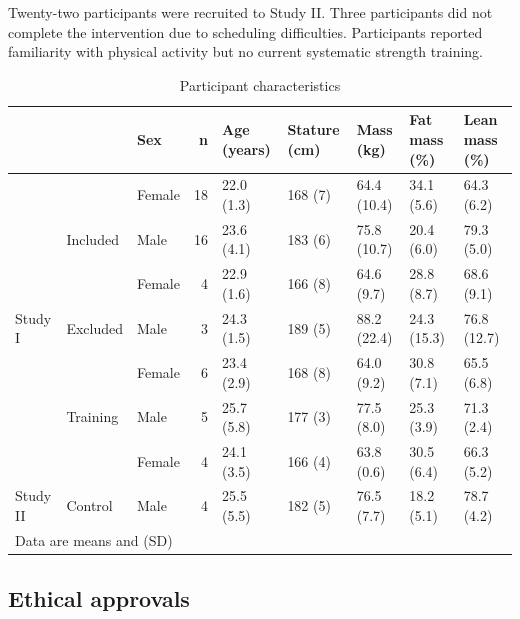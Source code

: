 \documentclass[twoside,10pt]{gihclass} %
\begin{document}
Twenty-two participants were recruited to Study II. Three participants did not complete the intervention due to scheduling difficulties. Participants reported familiarity with physical activity but no current systematic strength training.
\begin{landscape}\begin{table}

\caption{\label{tab:characteristics-table}Participant characteristics}
\centering
\fontsize{7}{9}\selectfont
\begin{tabular}[t]{lllrlllll}
\toprule
  &   & Sex & n & Age (years) & Stature
(cm) & Mass (kg) & Fat mass (\%) & Lean mass (\%)\\
\midrule
 &  & Female & 18 & 22.0 (1.3) & 168 (7) & 64.4 (10.4) & 34.1 (5.6) & 64.3 (6.2)\\
\cmidrule{3-9}
 & \multirow{-2}{*}{\raggedright\arraybackslash Included} & Male & 16 & 23.6 (4.1) & 183 (6) & 75.8 (10.7) & 20.4 (6.0) & 79.3 (5.0)\\
\cmidrule{2-9}
 &  & Female & 4 & 22.9 (1.6) & 166 (8) & 64.6 (9.7) & 28.8 (8.7) & 68.6 (9.1)\\
\cmidrule{3-9}
\multirow{-4}{*}{\raggedright\arraybackslash Study I} & \multirow{-2}{*}{\raggedright\arraybackslash Excluded} & Male & 3 & 24.3 (1.5) & 189 (5) & 88.2 (22.4) & 24.3 (15.3) & 76.8 (12.7)\\
\cmidrule{1-9}
 &  & Female & 6 & 23.4 (2.9) & 168 (8) & 64.0 (9.2) & 30.8 (7.1) & 65.5 (6.8)\\
\cmidrule{3-9}
 & \multirow{-2}{*}{\raggedright\arraybackslash Training} & Male & 5 & 25.7 (5.8) & 177 (3) & 77.5 (8.0) & 25.3 (3.9) & 71.3 (2.4)\\
\cmidrule{2-9}
 &  & Female & 4 & 24.1 (3.5) & 166 (4) & 63.8 (0.6) & 30.5 (6.4) & 66.3 (5.2)\\
\cmidrule{3-9}
\multirow{-4}{*}{\raggedright\arraybackslash Study II} & \multirow{-2}{*}{\raggedright\arraybackslash Control} & Male & 4 & 25.5 (5.5) & 182 (5) & 76.5 (7.7) & 18.2 (5.1) & 78.7 (4.2)\\
\bottomrule
\multicolumn{9}{l}{\rule{0pt}{1em}Data are means and (SD)}\\
\end{tabular}
\end{table}
\end{landscape}
\hypertarget{ethical-approvals}{%
\subsection{Ethical approvals}\label{ethical-approvals}}
\end{document}
